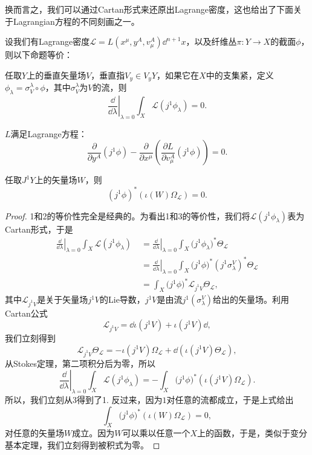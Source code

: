 换而言之，我们可以通过Cartan形式来还原出Lagrange密度，这也给出了下面关于Lagrangian方程的不同刻画之一。

\begin{thm}
    设我们有Lagrange密度$\mathcal{L}=L\left(x^\mu,y^A,v^A_\mu\right)\dd^{n+1}x$，以及纤维丛$\pi:Y\to X$的截面$\phi$，则以下命题等价：
    \begin{compactenum}
        \item 任取$Y$上的垂直矢量场$V$，垂直指$V_y\in V_yY$，如果它在$X$中的支集紧，定义$\phi_\lambda=\sigma^\lambda_V\circ \phi$，其中$\sigma^\lambda_V$为$V$的流，则\[\left.\frac{\dd}{\dd \lambda}\right|_{\lambda=0}\int_X \mathcal L(j^1\phi_\lambda)=0.\]
        \item $L$满足Lagrange方程：
        \[
            \frac{\partial}{\partial y^A}(j^1\phi)-\frac{\partial}{\partial x^\mu}\left(\frac{\partial L}{\partial v^A_\mu}(j^1\phi)\right)=0.
        \]
        \item 任取$J^1Y$上的矢量场$W$，则 
        \[
            (j^1\phi)^*(\iota(W)\Omega_{\mathcal L})=0.
        \]
    \end{compactenum}
\end{thm}

\begin{proof}
    1和2的等价性完全是经典的。为看出1和3的等价性，我们将$\mathcal L(j^1\phi_\lambda)$表为Cartan形式，于是
    \begin{align*}
        \left.\frac{\dd}{\dd \lambda}\right|_{\lambda=0}\int_X \mathcal L(j^1\phi_\lambda)\;&=\left.\frac{\dd}{\dd \lambda}\right|_{\lambda=0}\int_X \mathcal (j^1\phi_\lambda)^*\Theta_{\mathcal L}
        \\&=\left.\frac{\dd}{\dd \lambda}\right|_{\lambda=0}\int_X \mathcal (j^1\phi)^*(j^1\sigma^V_\lambda)^*\Theta_{\mathcal L}\\
        &=\int_X \mathcal (j^1\phi)^*\mathscr L_{j^1V}\Theta_{\mathcal L},
    \end{align*}
    其中$\mathscr L_{j^1V}$是关于矢量场$j^1V$的Lie导数，$j^1V$是由流$j^1(\sigma_\lambda^V)$给出的矢量场。利用Cartan公式
    \[
        \mathscr L_{j^1V}=\dd \iota(j^1V)+\iota(j^1V)\dd,
    \]
    我们立刻得到
    \[
        \mathscr L_{j^1V}\Theta_{\mathcal L}=-\iota(j^1V)\Omega_{\mathcal L}+\dd\left(\iota(j^1V) \Theta_{\mathcal L}\right),
    \]
    从Stokes定理，第二项积分后为零，所以
    \[
        \left.\frac{\dd}{\dd \lambda}\right|_{\lambda=0}\int_X \mathcal L(j^1\phi_\lambda)=-\int_X \mathcal (j^1\phi)^*(\iota(j^1V)\Omega_{\mathcal L}).
    \]
    所以，我们立刻从3得到了1. 反过来，因为$1$对任意的流都成立，于是上式给出
    \[
        \int_X \mathcal (j^1\phi)^*(\iota(W)\Omega_{\mathcal L})=0,
    \]
    对任意的矢量场$W$成立。因为$W$可以乘以任意一个$X$上的函数，于是，类似于变分基本定理，我们立刻得到被积式为零。
\end{proof}

